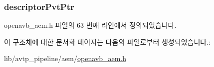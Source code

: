 \subsubsection[{\texorpdfstring{descriptor\+Pvt\+Ptr}{descriptorPvtPtr}}]{ descriptor\+Pvt\+Ptr}\hypertarget{structopenavb__aem__descriptor__common__t_a302e92fd6cf4d398d5305395359fb157}{}\label{structopenavb__aem__descriptor__common__t_a302e92fd6cf4d398d5305395359fb157}


openavb\+\_\+aem.\+h 파일의 63 번째 라인에서 정의되었습니다.



이 구조체에 대한 문서화 페이지는 다음의 파일로부터 생성되었습니다.\+:\begin{DoxyCompactItemize}
\item 
lib/avtp\+\_\+pipeline/aem/\hyperlink{openavb__aem_8h}{openavb\+\_\+aem.\+h}\end{DoxyCompactItemize}
